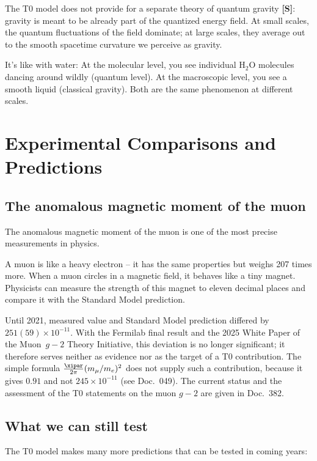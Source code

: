 	\begin{important}
		The T0 model does not provide for a separate theory of quantum gravity \textbf{[S]}: gravity is meant to be already part of the quantized energy field. At small scales, the quantum fluctuations of the field dominate; at large scales, they average out to the smooth spacetime curvature we perceive as gravity.
		
		It's like with water: At the molecular level, you see individual H$_2$O molecules dancing around wildly (quantum level). At the macroscopic level, you see a smooth liquid (classical gravity). Both are the same phenomenon at different scales.
	\end{important}
	
	\section{Experimental Comparisons and Predictions}
	
	\subsection{The anomalous magnetic moment of the muon}
	
	The anomalous magnetic moment of the muon is one of the most precise measurements in physics.

	A muon is like a heavy electron -- it has the same properties but weighs 207 times more. When a muon circles in a magnetic field, it behaves like a tiny magnet. Physicists can measure the strength of this magnet to eleven decimal places and compare it with the Standard Model prediction.

	Until 2021, measured value and Standard Model prediction differed by $251(59) \times 10^{-11}$. With the Fermilab final result and the 2025 White Paper of the Muon~$g-2$ Theory Initiative, this deviation is no longer significant; it therefore serves neither as evidence nor as the target of a T0 contribution. The simple formula $\frac{\xipar}{2\pi}(m_\mu/m_e)^2$ does not supply such a contribution, because it gives $0.91$ and not $245\times10^{-11}$ (see Doc.~049). The current status and the assessment of the T0 statements on the muon $g-2$ are given in Doc.~382.

	
	\subsection{What we can still test}
	
	The T0 model makes many more predictions that can be tested in coming years:
	
